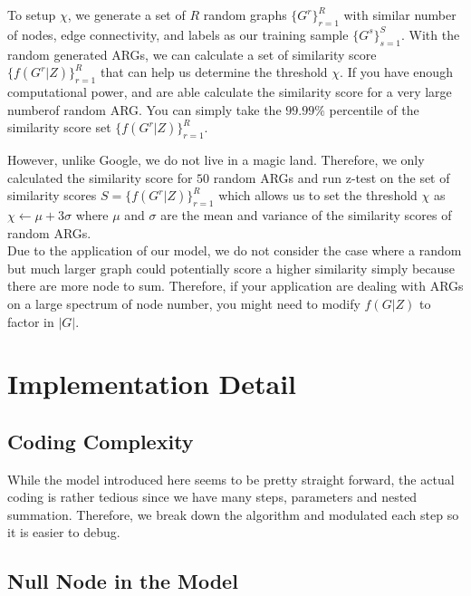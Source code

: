 To setup $\chi$, we generate a set of $R$ random graphs $\{G^r\}^{R}_{r=1}$ with similar number of nodes, edge connectivity\footnotemark, and labels as our training sample $\{G^s\}^{S}_{s=1}$. With the random generated ARGs, we can calculate a set of similarity score $\{f(G^r|Z)\}^{R}_{r=1}$ that can help us determine the threshold $\chi$. If you have enough computational power, and are able calculate the similarity score for a very large number\footnotemark of random ARG. You can simply take the $99.99\%$ percentile of the similarity score set $\{f(G^r|Z)\}^{R}_{r=1}$.\\

However, unlike Google\footnotemark, we do not live in a magic land. Therefore, we only calculated the similarity score for $50$ random ARGs and run z-test on the set of similarity scores $S=\{f(G^r|Z)\}^{R}_{r=1}$ which allows us to set the threshold $\chi$ as $\chi \leftarrow \mu+3\sigma$ where $\mu$ and $\sigma$ are the mean and variance of the similarity scores of random ARGs.
\\

Due to the application of our model, we do not consider the case where a random but much larger graph could potentially score a higher similarity simply because there are more node to sum. Therefore, if your application are dealing with ARGs on a large spectrum of node number, you might need to modify $f(G|Z)$ to factor in $|G|$.

\section{Implementation Detail}

\subsection{Coding Complexity}

While the model introduced here seems to be pretty straight forward, the actual coding is rather tedious since we have many steps, parameters and nested summation. Therefore, we break down the algorithm and modulated each step so it is easier to debug.

\subsection{Null Node in the Model}

